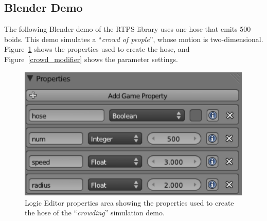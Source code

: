 \subsection{Blender Demo}

The following Blender demo of the RTPS library uses one hose that emits 500 boids. This demo simulates a ``\textit{crowd of people}'', whose motion is two-dimensional. Figure~\ref{crowd_prop} shows the properties used to create the hose, and Figure~\ref{crowd_modifier} shows the parameter settings. 

\begin{figure}[htbp]
\begin{center}
\includegraphics[scale=0.7]{figures/demo_crowds_prop.pdf}
\caption{Logic Editor properties area showing the properties used to create the hose of the ``\textit{crowding}'' simulation demo.}
\label{crowd_prop}
\end{center}
\end{figure}

